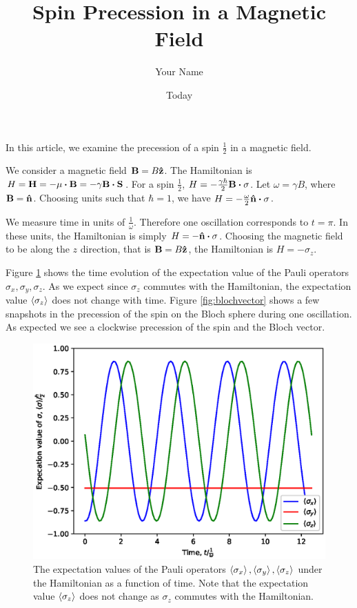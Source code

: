 \documentclass[letter]{article}
\title{Spin Precession in a Magnetic Field}
\author{Your Name}
\date{Today}
\begin{document}
\maketitle

In this article, we examine the precession of a spin $\frac{1}{2}$ in a magnetic field.

We consider a magnetic field $\vb{B} = B\vu{z}$. The Hamiltonian is $H = \vb{H} = -\vb{\mu}\vdot\vb{B} = -\gamma\vb{B}\vdot\vb{S}$. For a spin $\frac{1}{2}$, $H = -\frac{\gamma\hbar}{2}\vb{B}\vdot\vb{\sigma}$. Let $\omega = \gamma B$, where $\vb{B} = \vu{n}$. Choosing units such that $\hbar = 1$, we have $H = -\frac{\omega}{2} \vu{n}\vdot\vb{\sigma}$.

We measure time in units of $\frac{1}{\omega}$. Therefore one oscillation corresponds to $t = \pi$. In these units, the Hamiltonian is simply $H = - \vu{n}\vdot\vb{\sigma}$. Choosing the magnetic field to be along the $z$ direction, that is $\vb{B} = B\vu{z}$, the Hamiltonian is $H = -\sigma_z$.

Figure \ref{fig:expsigma} shows the time evolution of the expectation value of the Pauli operators $\sigma_x, \sigma_y, \sigma_z$. As we expect since $\sigma_z$ commutes with the Hamiltonian, the expectation value $\expval{\sigma_z}$ does not change with time. Figure \ref{fig:blochvector} shows a few snapshots in the precession of the spin on the Bloch sphere during one oscillation. As expected we see a clockwise precession of the spin and the Bloch vector.

\begin{figure}
  \centering
  \includegraphics{exp_sigma.eps}
  \caption{The expectation values of the Pauli operators $\expval{\sigma_x}, \expval{\sigma_y}, \expval{\sigma_z}$ under the Hamiltonian as a function of time. Note that the expectation value $\expval{\sigma_z}$ does not change as $\sigma_z$ commutes with the Hamiltonian.}
  \label{fig:expsigma}
\end{figure}
\end{document}
